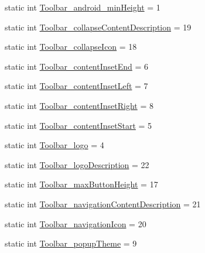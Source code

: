 \begin{DoxyCompactItemize}
\item 
static int \hyperlink{classandroid_1_1support_1_1v7_1_1appcompat_1_1R_1_1styleable_a278fbe4009580f8f98dba7fedb82ccbb}{Toolbar\+\_\+android\+\_\+min\+Height} = 1
\item 
static int \hyperlink{classandroid_1_1support_1_1v7_1_1appcompat_1_1R_1_1styleable_aec52a9c7ecfc4636844699ac144daa45}{Toolbar\+\_\+collapse\+Content\+Description} = 19
\item 
static int \hyperlink{classandroid_1_1support_1_1v7_1_1appcompat_1_1R_1_1styleable_a3e43f0fbbc70178e90fc837859e72471}{Toolbar\+\_\+collapse\+Icon} = 18
\item 
static int \hyperlink{classandroid_1_1support_1_1v7_1_1appcompat_1_1R_1_1styleable_a77f3e7561dfc11958910a87c4ffaf5be}{Toolbar\+\_\+content\+Inset\+End} = 6
\item 
static int \hyperlink{classandroid_1_1support_1_1v7_1_1appcompat_1_1R_1_1styleable_a70db7f911845893b9659eba7d5388946}{Toolbar\+\_\+content\+Inset\+Left} = 7
\item 
static int \hyperlink{classandroid_1_1support_1_1v7_1_1appcompat_1_1R_1_1styleable_a8195e4a7fe77915a6f6fda3aec2831c8}{Toolbar\+\_\+content\+Inset\+Right} = 8
\item 
static int \hyperlink{classandroid_1_1support_1_1v7_1_1appcompat_1_1R_1_1styleable_a57f32786084bf693a66215a7c9de31ca}{Toolbar\+\_\+content\+Inset\+Start} = 5
\item 
static int \hyperlink{classandroid_1_1support_1_1v7_1_1appcompat_1_1R_1_1styleable_ad17c84854643ce15da5744493c1e7f28}{Toolbar\+\_\+logo} = 4
\item 
static int \hyperlink{classandroid_1_1support_1_1v7_1_1appcompat_1_1R_1_1styleable_a0b18e2d1f2ae0e17ea6c1c72fbee6ad1}{Toolbar\+\_\+logo\+Description} = 22
\item 
static int \hyperlink{classandroid_1_1support_1_1v7_1_1appcompat_1_1R_1_1styleable_ae47cf713bfead553edda363c784fd33b}{Toolbar\+\_\+max\+Button\+Height} = 17
\item 
static int \hyperlink{classandroid_1_1support_1_1v7_1_1appcompat_1_1R_1_1styleable_a61b517f99cb13ca2690103136bdab8b5}{Toolbar\+\_\+navigation\+Content\+Description} = 21
\item 
static int \hyperlink{classandroid_1_1support_1_1v7_1_1appcompat_1_1R_1_1styleable_ab88a1ca69cc3dbb4e5ffdadec5f6288a}{Toolbar\+\_\+navigation\+Icon} = 20
\item 
static int \hyperlink{classandroid_1_1support_1_1v7_1_1appcompat_1_1R_1_1styleable_aa37388b9b7ea40ceaabc9534f732ee00}{Toolbar\+\_\+popup\+Theme} = 9

\end{DoxyCompactItemize}

